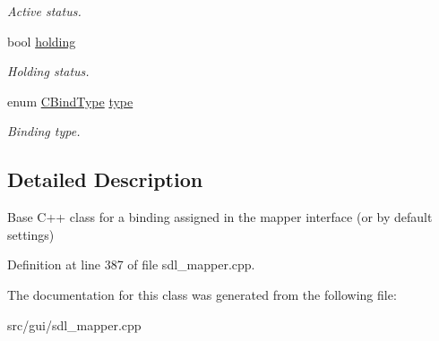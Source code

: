 \begin{DoxyCompactItemize}
\begin{DoxyCompactList}\small\item\em Active status. \end{DoxyCompactList}\item 
\hypertarget{classCBind_a4a0d6d7650d3a24cc0bc68c985d26ade}{bool \hyperlink{classCBind_a4a0d6d7650d3a24cc0bc68c985d26ade}{holding}}\label{classCBind_a4a0d6d7650d3a24cc0bc68c985d26ade}

\begin{DoxyCompactList}\small\item\em Holding status. \end{DoxyCompactList}\item 
\hypertarget{classCBind_a9e5121ab697c2c56cb20a20bd151ac45}{enum \hyperlink{classCBind_a6bd04329a3b3b8673f7bd4469f92eb61}{C\-Bind\-Type} \hyperlink{classCBind_a9e5121ab697c2c56cb20a20bd151ac45}{type}}\label{classCBind_a9e5121ab697c2c56cb20a20bd151ac45}

\begin{DoxyCompactList}\small\item\em Binding type. \end{DoxyCompactList}\end{DoxyCompactItemize}


\subsection{Detailed Description}
Base C++ class for a binding assigned in the mapper interface (or by default settings) 

Definition at line 387 of file sdl\-\_\-mapper.\-cpp.



The documentation for this class was generated from the following file\-:\begin{DoxyCompactItemize}
\item 
src/gui/sdl\-\_\-mapper.\-cpp\end{DoxyCompactItemize}
